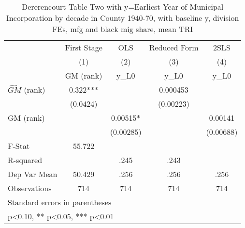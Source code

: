 \begin{table}[htbp]\centering
\def\sym#1{\ifmmode^{#1}\else\(^{#1}\)\fi}
\caption{Dererencourt Table Two with y=Earliest Year of Municipal Incorporation by decade in County 1940-70, with baseline y, division FEs, mfg and black mig share, mean TRI}
\begin{tabular}{l*{4}{c}}
\toprule
                    & First Stage   &         OLS   &Reduced Form   &        2SLS   \\
                    &\multicolumn{1}{c}{(1)}&\multicolumn{1}{c}{(2)}&\multicolumn{1}{c}{(3)}&\multicolumn{1}{c}{(4)}\\
                    &\multicolumn{1}{c}{GM  (rank)}&\multicolumn{1}{c}{y\_L0}&\multicolumn{1}{c}{y\_L0}&\multicolumn{1}{c}{y\_L0}\\
\midrule
$\hat{GM}$ (rank)   &       0.322***&               &    0.000453   &               \\
                    &    (0.0424)   &               &   (0.00223)   &               \\
\addlinespace
GM  (rank)          &               &     0.00515*  &               &     0.00141   \\
                    &               &   (0.00285)   &               &   (0.00688)   \\
\midrule
F-Stat              &      55.722   &               &               &               \\
R-squared           &               &        .245   &        .243   &               \\
Dep Var Mean        &      50.429   &        .256   &        .256   &        .256   \\
Observations        &         714   &         714   &         714   &         714   \\
\bottomrule
\multicolumn{5}{l}{\footnotesize Standard errors in parentheses}\\
\multicolumn{5}{l}{\footnotesize * p<0.10, ** p<0.05, *** p<0.01}\\
\end{tabular}
\end{table}
